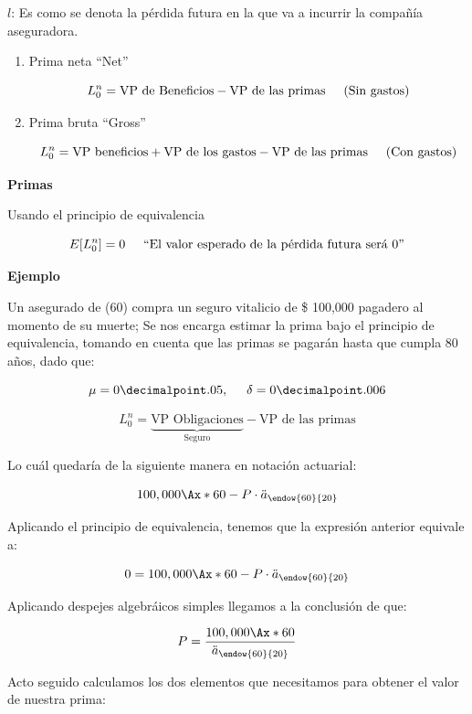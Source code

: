 \documentclass[12pt, a4paper, footinclude=true]{scrbook}
\begin{document}
$l$: Es como se denota la pérdida futura en la que va a incurrir la compañía aseguradora. 

\begin{enumerate}
	\item Prima neta ``Net''
	
	$$ L_0^n = \text{VP de Beneficios} - \text{VP de las primas} \hspace{.5cm} \text{(Sin gastos)}$$
	
	\item Prima bruta ``Gross''
	
	\[
		L_0^n = \text{VP beneficios} + \text{VP de los gastos} - \text{VP de las primas} \hspace{.5cm} \text{(Con gastos)}
	\]
\end{enumerate} 

\textbf{Primas}

Usando el principio de equivalencia


$$E[L_0^n] = 0 \hspace{.5cm} \text{``El valor esperado de la pérdida futura será 0''}$$

\textbf{Ejemplo}

\vspace{.5cm}

Un asegurado de (60) compra un seguro vitalicio de \$ 100,000 pagadero al momento de su muerte; Se nos encarga estimar la prima bajo el principio de equivalencia, tomando en cuenta que las primas se pagarán hasta que cumpla 80 años, dado que:

\[
	\mu = 0\decimalpoint.05, \hspace{0.5cm} \delta = 0\decimalpoint.006
\] 

\[
	L_0^n = \underbrace{\text{VP Obligaciones}}_{\text{Seguro}} - \text{VP de las primas}
\]

Lo cuál quedaría de la siguiente manera en notación actuarial:

\[
	100,000 \Ax*{60} - P \cdot \ddot{a}_{\endow{60}{20}}
\]

Aplicando el principio de equivalencia, tenemos que la expresión anterior equivale a: 

\[
	0 = 100,000 \Ax*{60} - P \cdot \ddot{a}_{\endow{60}{20}}
\]

Aplicando despejes algebráicos simples llegamos a la conclusión de que: 

\[
	P = \frac{100,000 \Ax*{60}}{\ddot{a}_{\endow{60}{20}}}
\]

Acto seguido calculamos los dos elementos que necesitamos para obtener el valor de nuestra prima: 
\end{document}
